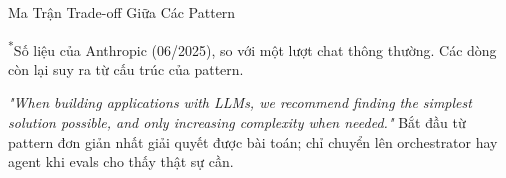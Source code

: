 \documentclass[aspectratio=1610,10pt,xcolor={table}]{beamer}
\begin{document}
\begin{frame}{Ma Trận Trade-off Giữa Các Pattern}
  \vspace{0.05cm}
  {\raggedright\tiny \textsuperscript{*}Số liệu của Anthropic (06/2025), so với một lượt chat thông thường. Các dòng còn lại suy ra từ cấu trúc của pattern.\par}

  \vspace{0.15cm}
  \begin{tcolorbox}[colback=boxbg,colframe=hcmutblue,title={\textbf{Simplicity-First (Anthropic, 2024)}},fonttitle=\footnotesize\bfseries]
    \scriptsize \textit{"When building applications with LLMs, we recommend finding the simplest solution possible, and only increasing complexity when needed."} Bắt đầu từ pattern đơn giản nhất giải quyết được bài toán; chỉ chuyển lên orchestrator hay agent khi evals cho thấy thật sự cần.
  \end{tcolorbox}
\end{frame}
\end{document}
